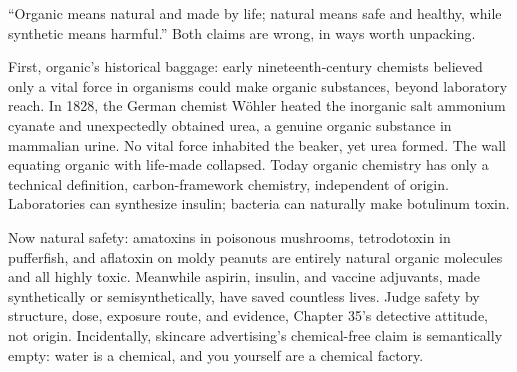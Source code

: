 \begin{wuqu}
``Organic means natural and made by life; natural means safe and healthy, while synthetic means harmful.'' Both claims are wrong, in ways worth unpacking.

First, organic's historical baggage: early nineteenth-century chemists believed only a vital force in organisms could make organic substances, beyond laboratory reach. In 1828, the German chemist Wöhler heated the inorganic salt ammonium cyanate and unexpectedly obtained urea, a genuine organic substance in mammalian urine. No vital force inhabited the beaker, yet urea formed. The wall equating organic with life-made collapsed. Today organic chemistry has only a technical definition, carbon-framework chemistry, independent of origin. Laboratories can synthesize insulin; bacteria can naturally make botulinum toxin.

Now natural safety: amatoxins in poisonous mushrooms, tetrodotoxin in pufferfish, and aflatoxin on moldy peanuts are entirely natural organic molecules and all highly toxic. Meanwhile aspirin, insulin, and vaccine adjuvants, made synthetically or semisynthetically, have saved countless lives. Judge safety by structure, dose, exposure route, and evidence, Chapter 35's detective attitude, not origin. Incidentally, skincare advertising's chemical-free claim is semantically empty: water is a chemical, and you yourself are a chemical factory.
\end{wuqu}

